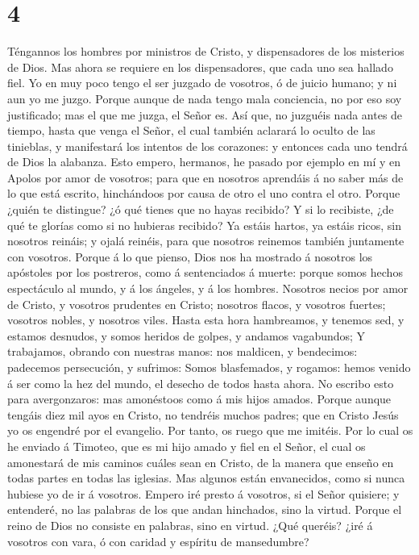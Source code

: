 \hypertarget{section-3}{%
\section{4}\label{section-3}}

 Téngannos los hombres por ministros de Cristo, y
dispensadores de los misterios de Dios.  Mas ahora se
requiere en los dispensadores, que cada uno sea hallado fiel.
 Yo en muy poco tengo el ser juzgado de vosotros, ó de
juicio humano; y ni aun yo me juzgo.  Porque aunque de
nada tengo mala conciencia, no por eso soy justificado; mas el que me
juzga, el Señor es.  Así que, no juzguéis nada antes de
tiempo, hasta que venga el Señor, el cual también aclarará lo oculto de
las tinieblas, y manifestará los intentos de los corazones: y entonces
cada uno tendrá de Dios la alabanza.  Esto empero,
hermanos, he pasado por ejemplo en mí y en Apolos por amor de vosotros;
para que en nosotros aprendáis á no saber más de lo que está escrito,
hinchándoos por causa de otro el uno contra el otro. 
Porque ¿quién te distingue? ¿ó qué tienes que no hayas recibido? Y si lo
recibiste, ¿de qué te glorías como si no hubieras recibido?
 Ya estáis hartos, ya estáis ricos, sin nosotros reináis;
y ojalá reinéis, para que nosotros reinemos también juntamente con
vosotros.  Porque á lo que pienso, Dios nos ha mostrado á
nosotros los apóstoles por los postreros, como á sentenciados á muerte:
porque somos hechos espectáculo al mundo, y á los ángeles, y á los
hombres.  Nosotros necios por amor de Cristo, y vosotros
prudentes en Cristo; nosotros flacos, y vosotros fuertes; vosotros
nobles, y nosotros viles.  Hasta esta hora hambreamos, y
tenemos sed, y estamos desnudos, y somos heridos de golpes, y andamos
vagabundos;  Y trabajamos, obrando con nuestras manos:
nos maldicen, y bendecimos: padecemos persecución, y sufrimos:
 Somos blasfemados, y rogamos: hemos venido á ser como la
hez del mundo, el desecho de todos hasta ahora.  No
escribo esto para avergonzaros: mas amonéstoos como á mis hijos amados.
 Porque aunque tengáis diez mil ayos en Cristo, no
tendréis muchos padres; que en Cristo Jesús yo os engendré por el
evangelio.  Por tanto, os ruego que me imitéis.
 Por lo cual os he enviado á Timoteo, que es mi hijo
amado y fiel en el Señor, el cual os amonestará de mis caminos cuáles
sean en Cristo, de la manera que enseño en todas partes en todas las
iglesias.  Mas algunos están envanecidos, como si nunca
hubiese yo de ir á vosotros.  Empero iré presto á
vosotros, si el Señor quisiere; y entenderé, no las palabras de los que
andan hinchados, sino la virtud.  Porque el reino de Dios
no consiste en palabras, sino en virtud.  ¿Qué queréis?
¿iré á vosotros con vara, ó con caridad y espíritu de mansedumbre?

